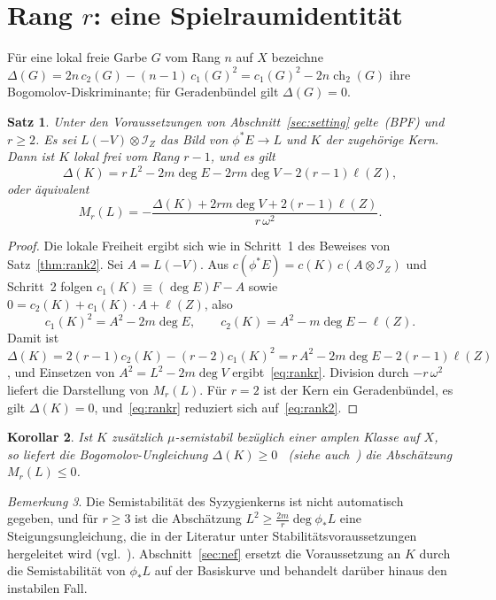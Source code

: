 \documentclass[11pt]{article}
\newtheorem{theorem}{Satz}[section]
\newtheorem{corollary}[theorem]{Korollar}
\theoremstyle{definition}
\theoremstyle{remark}
\newtheorem{remark}[theorem]{Bemerkung}
\DeclareMathOperator{\ch}{ch}
\newcommand{\cI}{\mathcal{I}}
\newcommand{\bpf}{\textup{(BPF)}}
\begin{document}
\section{Rang \texorpdfstring{$r$}{r}: eine Spielraumidentität}\label{sec:rankr}

Für eine lokal freie Garbe $G$ vom Rang $n$ auf $X$ bezeichne
$\Delta(G)=2n\,c_2(G)-(n-1)\,c_1(G)^2=c_1(G)^2-2n\ch_2(G)$ ihre
Bogomolov-Diskriminante; für Geradenbündel gilt $\Delta(G)=0$.

\begin{theorem}\label{thm:rankr}
Unter den Voraussetzungen von Abschnitt~\ref{sec:setting} gelte~\bpf{} und
$r\ge 2$. Es sei $L(-V)\otimes\cI_Z$ das Bild von $\phi^*E\to L$ und $K$ der
zugehörige Kern. Dann ist $K$ lokal frei vom Rang $r-1$, und es gilt
\begin{equation}\label{eq:rankr}
\Delta(K)=r\,L^2-2m\deg E-2rm\deg V-2(r-1)\ell(Z),
\end{equation}
oder äquivalent
\[
M_r(L)=-\frac{\Delta(K)+2rm\deg V+2(r-1)\ell(Z)}{r\,\omega^2}.
\]
\end{theorem}

\begin{proof}
Die lokale Freiheit ergibt sich wie in Schritt~1 des Beweises von
Satz~\ref{thm:rank2}. Sei $A=L(-V)$. Aus $c(\phi^*E)=c(K)\,c(A\otimes\cI_Z)$ und
Schritt~2 folgen $c_1(K)\equiv(\deg E)F-A$ sowie
$0=c_2(K)+c_1(K)\cdot A+\ell(Z)$, also
\[
c_1(K)^2=A^2-2m\deg E,\qquad c_2(K)=A^2-m\deg E-\ell(Z).
\]
Damit ist
$\Delta(K)=2(r-1)c_2(K)-(r-2)c_1(K)^2=r\,A^2-2m\deg E-2(r-1)\ell(Z)$, und Einsetzen
von $A^2=L^2-2m\deg V$ ergibt~\eqref{eq:rankr}. Division durch $-r\,\omega^2$
liefert die Darstellung von $M_r(L)$. Für $r=2$ ist der Kern ein Geradenbündel,
es gilt $\Delta(K)=0$, und~\eqref{eq:rankr} reduziert sich auf~\eqref{eq:rank2}.
\end{proof}

\begin{corollary}\label{cor:bogomolov}
Ist $K$ zusätzlich $\mu$-semistabil bezüglich einer amplen Klasse auf $X$, so
liefert die Bogomolov-Ungleichung $\Delta(K)\ge 0$~\cite{Bo78} (siehe
auch~\cite[\S3.4]{HL10}) die Abschätzung $M_r(L)\le 0$.
\end{corollary}

\begin{remark}\label{rem:rankr}
Die Semistabilität des Syzygienkerns ist nicht automatisch gegeben, und für
$r\ge 3$ ist die Abschätzung $L^2\ge\frac{2m}{r}\deg\phi_*L$ eine
Steigungsungleichung, die in der Literatur unter Stabilitätsvoraussetzungen
hergeleitet wird (vgl.~\cite{Xi87,CH88}). Abschnitt~\ref{sec:nef} ersetzt die
Voraussetzung an $K$ durch die Semistabilität von $\phi_*L$ auf der Basiskurve und
behandelt darüber hinaus den instabilen Fall.
\end{remark}
\end{document}
